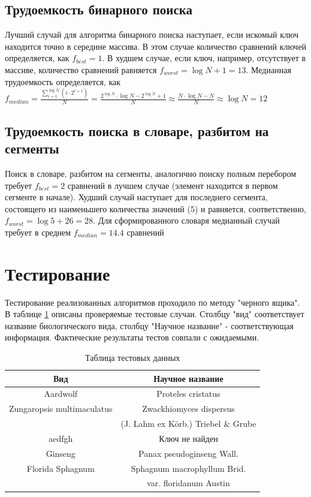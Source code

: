 \documentclass[a4paper,oneside,14pt]{extreport}
\begin{document}
\subsection{Трудоемкость бинарного поиска}
Лучший случай для алгоритма бинарного поиска наступает, если искомый ключ находится точно в середине массива. В этом случае количество сравнений ключей определяется, как $f_{best} = 1$. В худшем случае, если ключ, например, отсутствует в массиве, количество сравнений равняется $f_{worst} = \log N + 1 = 13$. Медианная трудоемкость определяется, как $f_{median} = \frac{\sum_{i = 1}^{\log N} (i \cdot 2^{i + 1})}{N} =  \frac{2^{\log N} \cdot \log N - 2^{\log N} + 1}{N} \approx \frac{N \cdot \log N - N}{N} \approx \log N = 12$\par
\subsection{Трудоемкость поиска в словаре, разбитом на сегменты}
Поиск в словаре, разбитом на сегменты, аналогично поиску полным перебором требует $f_{best} =2$ сравнений в лучшем случае (элемент находится в первом сегменте в начале). Худший случай наступает для последнего сегмента, состоящего из наименьшего количества значений (5) и равняется, соответственно, $f_{worst} = \log 5 + 26 = 28$. Для сформированного словаря медианный случай требует в среднем $f_{median} = 14.4$ сравнений 

\section{Тестирование}
Тестирование реализованных алгоритмов проходило по методу "черного ящика". В таблице \ref{table::testing} описаны проверяемые тестовые случаи. Столбцу "вид" соответствует название биологического вида, столбцу "Научное название" - соответствующая информация. Фактические результаты тестов совпали с ожидаемыми.

\begin{table} [!h]
	\begin{center}
		
		\captionsetup{justification=raggedleft}
		\caption{Таблица тестовых данных}
		\label{table::testing}
		
		\begin{tabular}{| c || c |} 
			\hline
			Вид & Научное название\\
			\hline \hline
			Aardwolf&Proteles cristatus\\
			Zungaropsis multimaculatus & Zwackhiomyces dispersus \\
					&(J. Lahm ex Körb.) Triebel \& Grube\\
			aedfgh & Ключ не найден\\
			Ginseng & Panax pseudoginseng Wall.\\
			Florida Sphagnum & Sphagnum macrophyllum Brid. \\
					&var. floridanum Austin\\
			\hline
		\end{tabular}
	\end{center}
\end{table}
\end{document}
